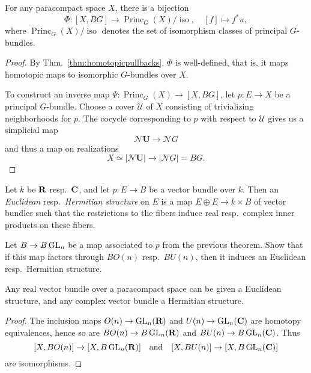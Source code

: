 \documentclass[a4paper,openany]{scrbook}
\DeclareMathOperator{\Princ}{Princ}
\newcommand{\nerve}{\mathcal N}
\begin{document}
\begin{thm}\label{thm:classifying-space}
For any paracompact space $X$, there is a bijection
\[
\Phi\colon [X,BG] \to \Princ_G(X)/\operatorname{iso}, \quad [f] \mapsto f^*u,
\]
where $\Princ_G(X)/\operatorname{iso}$ denotes the set of isomorphism classes of principal $G$-bundles.
\end{thm}
\begin{proof}
By Thm.~\ref{thm:homotopicpullbacks}, $\Phi$ is well-defined, that is, it maps homotopic maps to isomorphic $G$-bundles over $X$.

To construct an inverse map $\Psi\colon \Princ_G(X) \to [X,BG]$, let $p\colon E \to X$ be a principal $G$-bundle. Choose a cover $\mathcal U$ of $X$ consisting of trivializing neighborhoods for $p$. The cocycle corresponding to $p$ with respect to $\mathcal U$ gives us a simplicial map
\[
\nerve \mathbf U \to \nerve G
\]
and thus a map on realizations
\[
X \simeq |\nerve\mathbf U| \to |\nerve G| = BG.
\]
\end{proof}

Let $k$ be $\mathbf R$ resp.\ $\mathbf C$, and let $p\colon E \to B$ be a vector bundle over $k$. Then an \textit{Euclidean} resp.\ \textit{Hermitian structure} on $E$ is a map $E \oplus E \to k \times B$ of vector bundles such that the restrictions to the fibers induce real resp.\ complex inner products on these fibers.
\begin{exer}
Let $B \to B \operatorname{GL}_n$ be a map associated to $p$ from the previous theorem. Show that if this map factors through $B O(n)$ resp.\ $BU(n)$, then it induces an Euclidean resp.\ Hermitian structure.
\end{exer}	
\begin{corollary}\label{cor:euclideanstructure}
Any real vector bundle over a paracompact space can be given a Euclidean structure, and any complex vector bundle a Hermitian structure. 
\end{corollary}
\begin{proof}
The inclusion maps $O(n) \to \operatorname{GL}_n(\mathbf R)$ and $U(n) \to \operatorname{GL}_n(\mathbf C)$ are homotopy equivalences, hence so are $BO(n) \to B\operatorname{GL}_n(\mathbf R)$ and $BU(n) \to B\operatorname{GL}_n(\mathbf C)$. Thus
\[
[X,BO(n)] \to [X,B\operatorname{GL}_n(\mathbf R)] \quad \text{and} \quad [X,BU(n)] \to [X,B\operatorname{GL}_n(\mathbf C)]
\]
are isomorphisms.
\end{proof}
\end{document}
